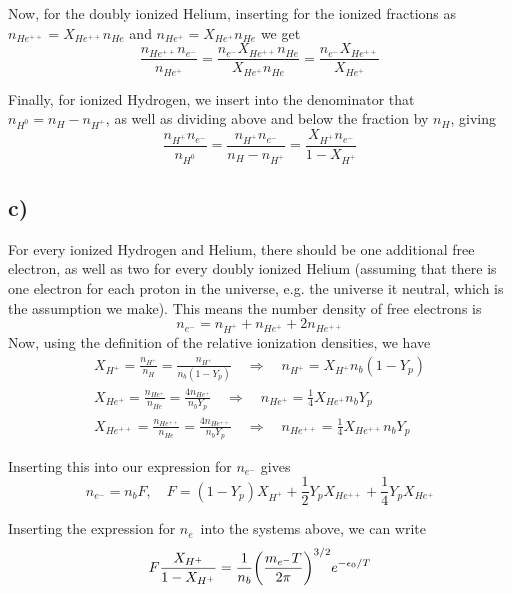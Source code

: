\documentclass[10pt, a4paper]{article}
\renewcommand{\exp}{e^}
\renewcommand{\exp}{e^}
\begin{document}
Now, for the doubly ionized Helium, inserting for the ionized fractions as $n_{He^{++}} = X_{He^{++}} n_{He}$ and $n_{He^{+}} = X_{He^{+}} n_{He}$ we get
\begin{equation}
    \frac{n_{He^{++}}n_{e^-}}{n_{He^+}} = \frac{n_{e^-}X_{He^{++}} n_{He}}{X_{He^{+}} n_{He}} = \frac{n_{e^-}X_{He^{++}}}{X_{He^{+}}}
\end{equation}

Finally, for ionized Hydrogen, we insert into the denominator that $n_{H^0} = n_H - n_{H^+}$, as well as dividing above and below the fraction by $n_H$, giving
\begin{equation}
    \frac{n_{H^{+}}n_{e^-}}{n_{H^0}} = 
    \frac{n_{H^{+}}n_{e^-}}{n_{H} - n_{H^+}} = 
    \frac{X_{H^{+}}n_{e^-}}{1 - X_{H^+}}
\end{equation}


\subsection*{c)}
For every ionized Hydrogen and Helium, there should be one additional free electron, as well as two for every doubly ionized Helium (assuming that there is one electron for each proton in the universe, e.g. the universe it neutral, which is the assumption we make). This means the number density of free electrons is
\begin{equation}
    \label{eqn:ne-}
    n_{e^-} = n_{H^+} + n_{He^+} + 2n_{He^{++}}
\end{equation}
Now, using the definition of the relative ionization densities, we have
\begin{align}
    X_{H^+} = \frac{n_{H^+}}{n_H} = \frac{n_{H^+}}{n_b(1-Y_p)} \quad\Rightarrow\quad n_{H^+} = X_{H^+} n_b(1 - Y_p)\\
    X_{He^+} = \frac{n_{He^+}}{n_{He}} = \frac{4n_{He^+}}{n_b Y_p} \quad\Rightarrow\quad n_{He^+} = \frac{1}{4}X_{He^+} n_b Y_p\\
    X_{He^{++}} = \frac{n_{He^{++}}}{n_{He}} = \frac{4n_{He^{++}}}{n_b Y_p} \quad\Rightarrow\quad n_{He^{++}} = \frac{1}{4}X_{He^{++}} n_b Y_p
\end{align}

Inserting this into our expression for $n_{e^-}$ gives
\begin{equation}
    n_{e^-} = n_b F, \quad F = (1-Y_p)X_{H^+} + \frac{1}{2}Y_p X_{He^{++}} + \frac{1}{4}Y_p X_{He^+}
\end{equation}

Inserting the expression for $n_e$ into the systems above, we can write
\begin{equation}
    F\frac{X_{H^{+}}}{1 - X_{H^+}} = \frac{1}{n_b}\qty(\frac{m_{e^-}T}{2\pi})^{3/2} \exp{-\epsilon_0/T}
\end{equation}
\end{document}
